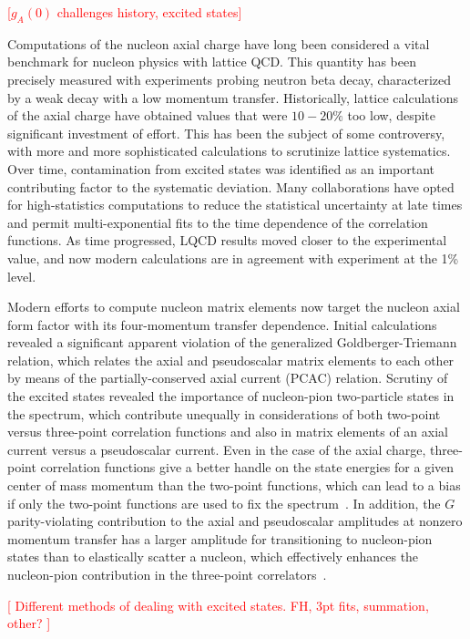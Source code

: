 
\textcolor{red}{[$g_A(0)$ challenges history, excited states]}

Computations of the nucleon axial charge have long been considered
 a vital benchmark for nucleon physics with lattice QCD.
This quantity has been precisely measured with experiments probing neutron beta decay,
 characterized by a weak decay with a low momentum transfer.
Historically, lattice calculations of the axial charge have obtained values
 that were $10-20\%$ too low, despite significant investment of effort.
This has been the subject of some controversy,
 with more and more sophisticated calculations to scrutinize lattice systematics.
Over time, contamination from excited states was identified as
 an important contributing factor to the systematic deviation.
Many collaborations have opted for high-statistics computations
 to reduce the statistical uncertainty at late times and permit
 multi-exponential fits to the time dependence of the correlation functions.
As time progressed, LQCD results moved closer to the experimental value,
 and now modern calculations are in agreement with experiment at the 1\% level.

Modern efforts to compute nucleon matrix elements now target the nucleon
 axial form factor with its four-momentum transfer dependence.
Initial calculations revealed a significant apparent violation of the
 generalized Goldberger-Triemann relation, which relates the axial and pseudoscalar
 matrix elements to each other by means of the partially-conserved axial current (PCAC) relation.
Scrutiny of the excited states revealed the importance of nucleon-pion two-particle states
 in the spectrum, which contribute unequally in considerations of both
 two-point versus three-point correlation functions
 and also in matrix elements of an axial current versus a pseudoscalar current.
Even in the case of the axial charge,
 three-point correlation functions give a better handle on
 the state energies for a given center of mass momentum than the two-point functions,
 which can lead to a bias if only the two-point functions are used to fix the
 spectrum~\cite{He:2021yvm}.
In addition, the $G$ parity-violating contribution to the axial and pseudoscalar amplitudes
 at nonzero momentum transfer has a larger amplitude for transitioning
 to nucleon-pion states than to elastically scatter a nucleon,
 which effectively enhances the nucleon-pion contribution in the three-point
 correlators~\cite{Jang:2019vkm}.

\textcolor{red}{[
 Different methods of dealing with excited states.
 FH, 3pt fits, summation, other?
]}

